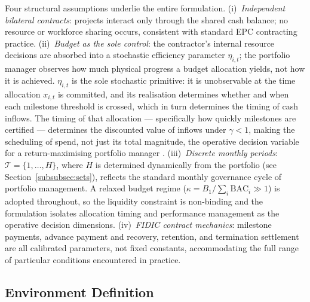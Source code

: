 Four structural assumptions underlie the entire formulation.
(i)~\emph{Independent bilateral contracts}: projects interact only through
the shared cash balance; no resource or workforce sharing occurs, consistent
with standard EPC contracting practice.
(ii)~\emph{Budget as the sole control}: the contractor's internal resource
decisions are absorbed into a stochastic efficiency parameter $\eta_{i,t}$;
the portfolio manager observes how much physical progress a budget allocation
yields, not how it is achieved. $\eta_{i,t}$ is the sole stochastic primitive:
it is unobservable at the time allocation $x_{i,t}$ is committed, and its
realisation determines whether and when each milestone threshold is crossed,
which in turn determines the timing of cash inflows. The timing of that
allocation --- specifically how quickly milestones are certified --- determines
the discounted value of inflows under $\gamma < 1$, making the scheduling of
spend, not just its total magnitude, the operative decision variable for a
return-maximising portfolio manager \citep{Damodaran2012}.
(iii)~\emph{Discrete monthly periods}: $\mathcal{T} = \{1,\ldots,H\}$,
where $H$ is determined dynamically from the portfolio
(see Section~\ref{subsubsec:sets}), reflects the standard monthly
governance cycle of portfolio management. A relaxed budget regime
($\kappa = B_1 / \sum_i \mathrm{BAC}_i \gg 1$) is adopted throughout,
so the liquidity constraint is non-binding and the formulation isolates
allocation timing and performance management as the operative decision
dimensions.
(iv)~\emph{FIDIC contract mechanics}: milestone payments, advance payment
and recovery, retention, and termination settlement are all calibrated
parameters, not fixed constants, accommodating the full range of particular
conditions encountered in practice.

\subsection{Environment Definition}
\label{subsec:environment}

